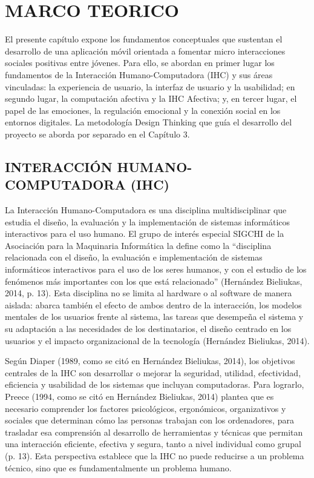 \chapter{MARCO TEORICO}
El presente capítulo expone los fundamentos conceptuales que sustentan el desarrollo de una aplicación móvil orientada a fomentar micro interacciones sociales positivas entre jóvenes. Para ello, se abordan en primer lugar los fundamentos de la Interacción Humano-Computadora (IHC) y sus áreas vinculadas: la experiencia de usuario, la interfaz de usuario y la usabilidad; en segundo lugar, la computación afectiva y la IHC Afectiva; y, en tercer lugar, el papel de las emociones, la regulación emocional y la conexión social en los entornos digitales. La metodología Design Thinking que guía el desarrollo del proyecto se aborda por separado en el Capítulo 3.

\section{INTERACCIÓN HUMANO-COMPUTADORA (IHC)}
La Interacción Humano-Computadora es una disciplina multidisciplinar que estudia el diseño, la evaluación y la implementación de sistemas informáticos interactivos para el uso humano. El grupo de interés especial SIGCHI de la Asociación para la Maquinaria Informática la define como la ``disciplina relacionada con el diseño, la evaluación e implementación de sistemas informáticos interactivos para el uso de los seres humanos, y con el estudio de los fenómenos más importantes con los que está relacionado'' (Hernández Bieliukas, 2014, p. 13). Esta disciplina no se limita al hardware o al software de manera aislada: abarca también el efecto de ambos dentro de la interacción, los modelos mentales de los usuarios frente al sistema, las tareas que desempeña el sistema y su adaptación a las necesidades de los destinatarios, el diseño centrado en los usuarios y el impacto organizacional de la tecnología (Hernández Bieliukas, 2014).

Según Diaper (1989, como se citó en Hernández Bieliukas, 2014), los objetivos centrales de la IHC son desarrollar o mejorar la seguridad, utilidad, efectividad, eficiencia y usabilidad de los sistemas que incluyan computadoras. Para lograrlo, Preece (1994, como se citó en Hernández Bieliukas, 2014) plantea que es necesario comprender los factores psicológicos, ergonómicos, organizativos y sociales que determinan cómo las personas trabajan con los ordenadores, para trasladar esa comprensión al desarrollo de herramientas y técnicas que permitan una interacción eficiente, efectiva y segura, tanto a nivel individual como grupal (p. 13). Esta perspectiva establece que la IHC no puede reducirse a un problema técnico, sino que es fundamentalmente un problema humano.

